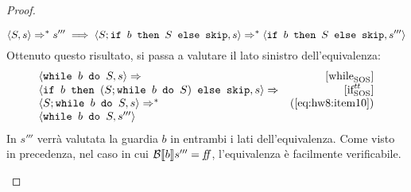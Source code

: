 \begin{proof}
\begin{itemize}
  \begin{equation}
  \confSs{S}{s} \Rar{*} s'''
    \implies
  \confSs{S; \ifABC{b}{S}{\skipForFriends}}{s} \Rar{*}
        \confSs{\ifABC{b}{S}{\skipForFriends}}{s'''}
  \label{eq:hw8:itemX}
  \end{equation}
  Ottenuto questo risultato, si passa a valutare il lato sinistro
  dell'equivalenza:
  $$
  \begin{array}{lr}
  \confSs{\wbS{b}{S}}{s} \Rar{ }  & \whileSOS \\
  \confSs{\ifABC{b}{(S;\wbS{b}{S})}{\skipForFriends}}{s} \Rar{ } & \ifttSOS\\
  \confSs{S; \wbS{b}{S}}{s} \Rar{*} & (\text{\ref{eq:hw8:item10}})\\
  \confSs{\wbS{b}{S}}{s'''}
  \end{array}
  $$
  In $s'''$ verrà valutata la guardia $b$ in entrambi i lati dell'equivalenza.
  Come visto in precedenza, nel caso in cui $\B{b}''' = \semfalse$,
  l'equivalenza è facilmente verificabile.


\end{itemize}
\end{proof}
